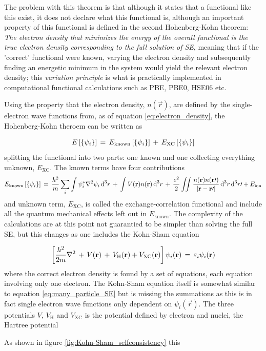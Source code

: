 {The problem with this theorem is that although it states that a functional like this exist, it does not declare what this functional is, although an important property of this functional is defined in the second Hohenberg-Kohn theorem: \textit{The electron density that minimizes the energy of the overall functional is the true electron density corresponding to the full solution of SE}, meaning that if the 'correct' functional were known, varying the electron density and subsequently finding an energetic minimum in the system would yield the relevant electron density; this \textit{variation principle} is what is practically implemented in computational functional calculations such as PBE, PBE0, HSE06 etc.

Using the property that the electron density, $n(\vec{r})$, are defined by the single-electron wave functions from, as of equation \ref{eq:electron_density}, the Hohenberg-Kohn theroem can be written as

\begin{align}
E\left[ \lbrace \psi_i \rbrace \right] \,=\, E_{\text{known}}\left[ \lbrace \psi_i \rbrace \right] \,+\, E_{\text{XC}}\left[ \lbrace \psi_i \rbrace \right]
\end{align}
splitting the functional into two parts: one known and one collecting everything unknown, $E_{\text{XC}}$. The known terms have four contributions
\begin{align}
E_{\text{known}}\left[ \lbrace \psi_i \rbrace \right] 	\,=\, 
		\dfrac{h^2}{m}	\sum_{i}\int \psi_i^* \nabla^2 \psi_i \, \text{d}^3 r 
		\,+\,
		\int V(\textbf{r})n(\textbf{r})\,\text{d}^3 r 
		\,+\,
		\dfrac{e^2}{2} 
		\iint \dfrac{
			n(\textbf{r})n(\textbf{r}\prime)
						}
						{
			\left| \textbf{r}-\textbf{r}\prime \right|}
			\,\text{d}^3 r \,\text{d}^3 r\prime + E_{\text{ion}}
\end{align}
and unknown term, $E_{\text{XC}}$, is called the exchange-correlation functional and include all the quantum mechanical effects left out in $E_{\text{known}}$. The complexity of the calculations are at this point not guarantied to be simpler than solving the full SE, but this changes as one includes the Kohn-Sham equation

\begin{align}
\left[ \dfrac{h^2}{2m}\nabla^2
\,+\, V(\textbf{r}) \,+\, V_{\text{H}}(\textbf{r}) + V_{\text{XC}}(\textbf{r})
 \right]
\psi_i(\textbf{r})	\,=\, \varepsilon_i\psi_i(\textbf{r})
\end{align}
where the correct electron density is found by a set of equations, each equation involving only one electron. The Kohn-Sham equation itself is somewhat similar to equation \ref{eq:many_particle_SE} but is missing the summations as this is in fact single electron wave functions only dependent on $\psi_i(\vec{r})$. The three potentials $V$, $V_{\text{H}}$ and $V_{\text{XC}}$ is the potential defined by electron and nuclei, the Hartree potential 

As shown in figure \ref{fig:Kohn-Sham_selfconsistency} this 



}



















